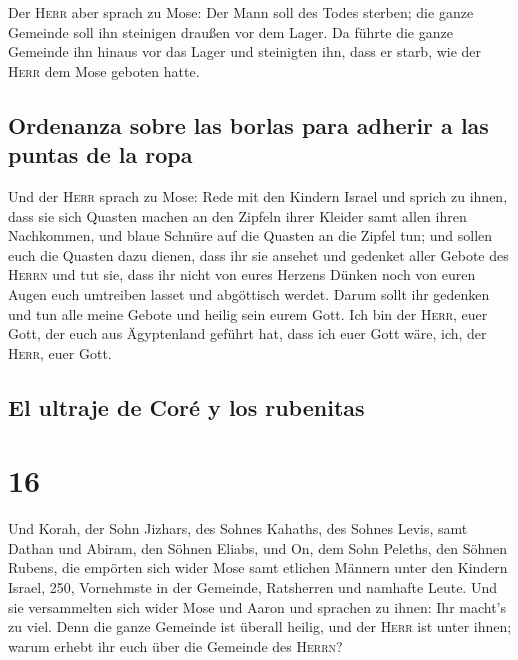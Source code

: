  Der \textsc{Herr} aber sprach zu Mose: Der Mann soll des
Todes sterben; die ganze Gemeinde soll ihn steinigen draußen vor dem
Lager.  Da führte die ganze Gemeinde ihn hinaus vor das
Lager und steinigten ihn, dass er starb, wie der \textsc{Herr} dem Mose
geboten hatte.

\hypertarget{ordenanza-sobre-las-borlas-para-adherir-a-las-puntas-de-la-ropa}{%
\subsection{Ordenanza sobre las borlas para adherir a las puntas de la
ropa}\label{ordenanza-sobre-las-borlas-para-adherir-a-las-puntas-de-la-ropa}}

 Und der \textsc{Herr} sprach zu Mose: 
Rede mit den Kindern Israel und sprich zu ihnen, dass sie sich Quasten
machen an den Zipfeln ihrer Kleider samt allen ihren Nachkommen, und
blaue Schnüre auf die Quasten an die Zipfel tun;  und
sollen euch die Quasten dazu dienen, dass ihr sie ansehet und gedenket
aller Gebote des \textsc{Herrn} und tut sie, dass ihr nicht von eures
Herzens Dünken noch von euren Augen euch umtreiben lasset und abgöttisch
werdet.  Darum sollt ihr gedenken und tun alle meine
Gebote und heilig sein eurem Gott.  Ich bin der
\textsc{Herr}, euer Gott, der euch aus Ägyptenland geführt hat, dass ich
euer Gott wäre, ich, der \textsc{Herr}, euer Gott.

\hypertarget{el-ultraje-de-coruxe9-y-los-rubenitas}{%
\subsection{El ultraje de Coré y los
rubenitas}\label{el-ultraje-de-coruxe9-y-los-rubenitas}}

\hypertarget{section-15}{%
\section{16}\label{section-15}}

 Und Korah, der Sohn Jizhars, des Sohnes Kahaths, des
Sohnes Levis, samt Dathan und Abiram, den Söhnen Eliabs, und On, dem
Sohn Peleths, den Söhnen Rubens,  die empörten sich wider
Mose samt etlichen Männern unter den Kindern Israel, 250, Vornehmste in
der Gemeinde, Ratsherren und namhafte Leute.  Und sie
versammelten sich wider Mose und Aaron und sprachen zu ihnen: Ihr
macht's zu viel. Denn die ganze Gemeinde ist überall heilig, und der
\textsc{Herr} ist unter ihnen; warum erhebt ihr euch über die Gemeinde
des \textsc{Herrn}?

